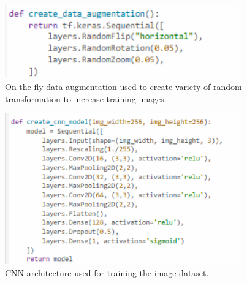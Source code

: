 \begin{figure}[!htbp]
	\centering
	\includegraphics[width=0.9\textwidth, angle=0]{figures/live_augmentation.png}
	\caption{On-the-fly data augmentation used to create variety of random transformation to increase training images.}
\end{figure}

\begin{figure}[!htbp]
	\centering
	\includegraphics[width=0.9\textwidth, angle=0]{figures/CNN_layers.png}
	\caption{CNN architecture used for training the image dataset.}
\end{figure}

